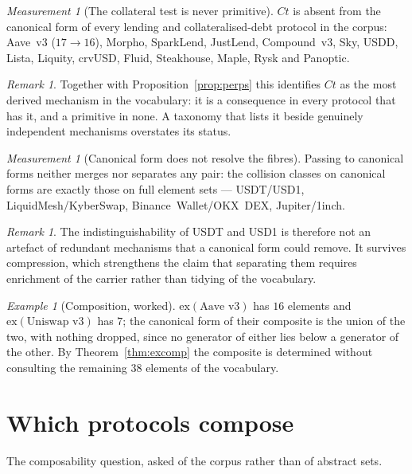 \documentclass[11pt]{article}
\theoremstyle{definition}
\theoremstyle{plain}
\theoremstyle{remark}
\newtheorem{measurement}[definition]{Measurement}
\newtheorem{remark}[definition]{Remark}
\newtheorem{example}[definition]{Example}
\begin{document}
\begin{measurement}[The collateral test is never primitive]\label{prop:ct}
$Ct$ is absent from the canonical form of every lending and collateralised-debt
protocol in the corpus: Aave~v3 ($17 \to 16$), Morpho, SparkLend, JustLend,
Compound~v3, Sky, USDD, Lista, Liquity, crvUSD, Fluid, Steakhouse, Maple,
Rysk and Panoptic.
\end{measurement}

\begin{remark}
Together with Proposition~\ref{prop:perps} this identifies $Ct$ as the most
derived mechanism in the vocabulary: it is a consequence in every protocol that
has it, and a primitive in none. A taxonomy that lists it beside genuinely
independent mechanisms overstates its status.
\end{remark}

\begin{measurement}[Canonical form does not resolve the fibres]\label{prop:fibres}
Passing to canonical forms neither merges nor separates any pair: the collision
classes on canonical forms are exactly those on full element sets --- USDT/USD1,
LiquidMesh/KyberSwap, Binance~Wallet/OKX~DEX, Jupiter/1inch.
\end{measurement}

\begin{remark}
The indistinguishability of USDT and USD1 is therefore not an artefact of
redundant mechanisms that a canonical form could remove. It survives compression,
which strengthens the claim that separating them requires enrichment of the
carrier rather than tidying of the vocabulary.
\end{remark}

\begin{example}[Composition, worked]\label{ex:comp}
$\mathrm{ex}(\text{Aave~v3})$ has $16$ elements and
$\mathrm{ex}(\text{Uniswap~v3})$ has $7$; the canonical form of their composite is
the union of the two, with nothing dropped, since no generator of either lies
below a generator of the other. By Theorem~\ref{thm:excomp} the composite is
determined without consulting the remaining $38$ elements of the vocabulary.
\end{example}

\section{Which protocols compose}\label{sec:pairs}

The composability question, asked of the corpus rather than of abstract sets.
\end{document}
